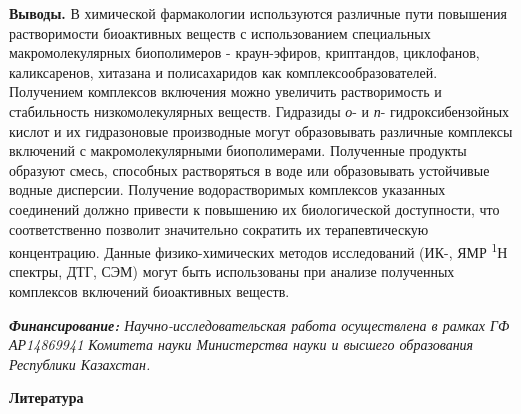 \begin{multicols}{2}
{\bfseries Выводы.} В химической фармакологии используются различные пути
повышения растворимости биоактивных веществ с использованием специальных
макромолекулярных биополимеров - краун-эфиров, криптандов, циклофанов,
каликсаренов, хитазана и полисахаридов как комплексообразователей.
Получением комплексов включения можно увеличить растворимость и
стабильность низкомолекулярных веществ. Гидразиды \emph{о}- и \emph{п}-
гидроксибензойных кислот и их гидразоновые производные могут
образовывать различные комплексы включений с макромолекулярными
биополимерами. Полученные продукты образуют смесь, способных
растворяться в воде или образовывать устойчивые водные дисперсии.
Получение водорастворимых комплексов указанных соединений должно
привести к повышению их биологической доступности, что соответственно
позволит значительно сократить их терапевтическую концентрацию. Данные
физико-химических методов исследований (ИК-, ЯМР \textsuperscript{1}Н
спектры, ДТГ, СЭМ) могут быть использованы при анализе полученных
комплексов включений биоактивных веществ.

\emph{{\bfseries Финансирование:} Научно-исследовательская работа
осуществлена в рамках ГФ АР14869941 Комитета науки Министерства науки и
высшего образования Республики Казахстан.}
\end{multicols}

\begin{center}
{\bfseries Литература}
\end{center}

